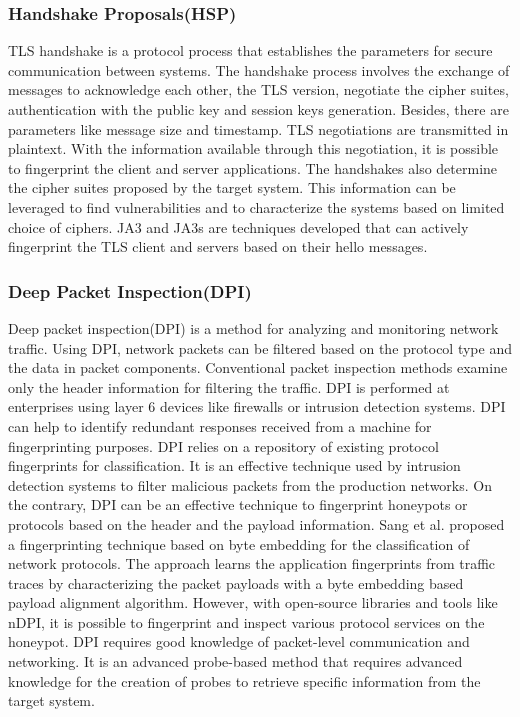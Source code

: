 \subsubsection{Handshake Proposals(HSP)}
TLS handshake is a protocol process that establishes the parameters for secure communication between systems. The handshake process involves the exchange of messages to acknowledge each other, the TLS version,  negotiate the cipher suites, authentication with the public key and session keys generation. Besides, there are parameters like message size and timestamp. TLS negotiations are transmitted in plaintext. With the information available through this negotiation, it is possible to fingerprint the client and server applications.  The handshakes also determine the cipher suites proposed by the target system. This information can be leveraged to find vulnerabilities and to characterize the systems based on limited choice of ciphers. JA3 and JA3s\cite{JA3} are techniques developed that can actively fingerprint the TLS client and servers based on their hello messages.


\subsubsection{Deep Packet Inspection(DPI)}
Deep packet inspection(DPI) is a method for analyzing and monitoring network traffic. Using DPI, network packets can be filtered based on the protocol type and the data in packet components. Conventional packet inspection methods examine only the header information for filtering the traffic. DPI is performed at enterprises using layer 6 devices like firewalls or intrusion detection systems. DPI can help to identify redundant responses received from a machine for fingerprinting purposes. DPI relies on a repository of existing protocol fingerprints for classification. It is an effective technique used by intrusion detection systems  to filter malicious packets from the production networks. On the contrary, DPI can be an effective technique to fingerprint honeypots or protocols based on the header and the payload information. Sang et al.\cite{Sang} proposed a fingerprinting technique based on byte embedding for the classification of network protocols. The approach learns the application fingerprints from traffic traces by characterizing the packet payloads with a byte embedding based payload alignment algorithm. However, with open-source libraries and tools like nDPI\cite{nDPI}, it is possible to fingerprint and inspect various protocol services on the honeypot. DPI requires good knowledge of packet-level communication and networking. It is an advanced probe-based method that requires advanced knowledge for the creation of probes to retrieve specific information from the target system.  



